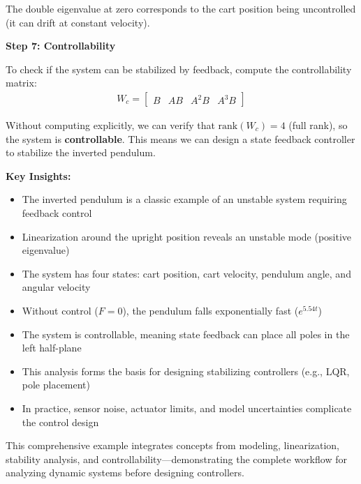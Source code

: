 \documentclass[11pt,a4paper]{article}
\begin{document}
The double eigenvalue at zero corresponds to the cart position being uncontrolled (it can drift at constant velocity).

\textbf{Step 7: Controllability}

To check if the system can be stabilized by feedback, compute the controllability matrix:
\begin{align}
  W_c = \begin{bmatrix} B & AB & A^2B & A^3B \end{bmatrix}
\end{align}

Without computing explicitly, we can verify that $\text{rank}(W_c) = 4$ (full rank), so the system is \textbf{controllable}. This means we can design a state feedback controller to stabilize the inverted pendulum.

\textbf{Key Insights:}
\begin{itemize}
  \item The inverted pendulum is a classic example of an unstable system requiring feedback control
  \item Linearization around the upright position reveals an unstable mode (positive eigenvalue)
  \item The system has four states: cart position, cart velocity, pendulum angle, and angular velocity
  \item Without control ($F = 0$), the pendulum falls exponentially fast ($e^{5.54t}$)
  \item The system is controllable, meaning state feedback can place all poles in the left half-plane
  \item This analysis forms the basis for designing stabilizing controllers (e.g., LQR, pole placement)
  \item In practice, sensor noise, actuator limits, and model uncertainties complicate the control design
\end{itemize}

This comprehensive example integrates concepts from modeling, linearization, stability analysis, and controllability—demonstrating the complete workflow for analyzing dynamic systems before designing controllers.
\end{document}
